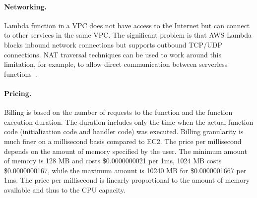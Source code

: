 \paragraph{Networking.} Lambda function in a VPC does not have access to the Internet but can connect to other services in the same VPC. The significant problem is that AWS Lambda blocks inbound network connections but supports outbound TCP/UDP connections. NAT traversal techniques can be used to work around this limitation, for example, to allow direct communication between serverless functions~\cite{moyer_punching_2021}. 

\paragraph{Pricing.} Billing is based on the number of requests to the function and the function execution duration. The duration includes only the time when the actual function code (initialization code and handler code) was executed. Billing granularity is much finer on a millisecond basis compared to EC2. The price per millisecond depends on the amount of memory specified by the user. The minimum amount of memory is 128 MB and costs \$0.0000000021 per 1ms, 1024 MB costs \$0.0000000167, while the maximum amount is 10240 MB for \$0.0000001667 per 1ms. The price per millisecond is linearly proportional to the amount of memory available and thus to the CPU capacity.
